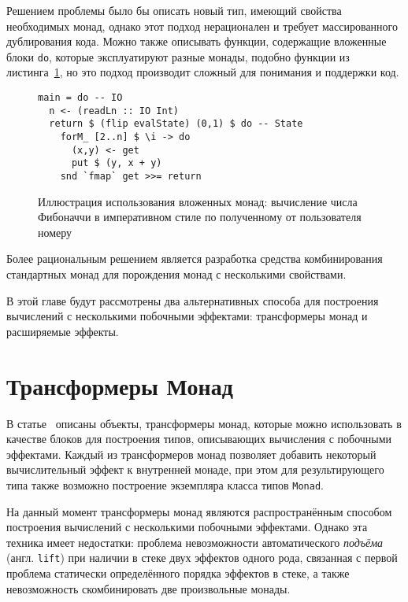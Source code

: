 Решением проблемы было бы описать новый тип, имеющий свойства необходимых монад,
однако этот подход нерационален и требует массированного дублирования кода. 
Можно также описывать функции, содержащие вложенные блоки \lstinline{do}, 
которые эксплуатируют разные монады, подобно функции из 
листинга~\ref{listing:nestedMonads}, но это подход производит сложный для
понимания и поддержки код.

\begin{figure}[h]
\begin{lstlisting}
main = do -- IO
  n <- (readLn :: IO Int)
  return $ (flip evalState) (0,1) $ do -- State
    forM_ [2..n] $ \i -> do
      (x,y) <- get
      put $ (y, x + y)
    snd `fmap` get >>= return

\end{lstlisting}
\caption{Иллюстрация использования вложенных монад: вычисление числа Фибоначчи в
императивном стиле по полученному от пользователя номеру}
\label{listing:nestedMonads}
\end{figure}

Более рациональным решением является разработка средства комбинирования 
стандартных монад для порождения монад с несколькими свойствами. 

В этой главе будут рассмотрены два альтернативных способа для построения 
вычислений с несколькими побочными эффектами: трансформеры монад и расширяемые
эффекты.  

\section{Трансформеры Монад}

В статье~\cite{monadTransformers} описаны объекты, трансформеры монад, 
которые можно использовать в качестве блоков для построения типов, описывающих 
вычисления с побочными эффектами. Каждый из трансформеров монад позволяет 
добавить некоторый вычислительный эффект к внутренней монаде, при 
этом для результирующего типа также возможно построение экземпляра класса 
типов \lstinline{Monad}.

На данный момент трансформеры монад являются распространённым способом 
построения вычислений с несколькими побочными эффектами. Однако эта 
техника имеет недостатки: проблема невозможности автоматического 
\emph{подъёма} (англ. \lstinline{lift}) при наличии в стеке двух эффектов одного
рода, связанная с первой проблема статически определённого порядка эффектов в 
стеке, а также невозможность скомбинировать две произвольные монады.


